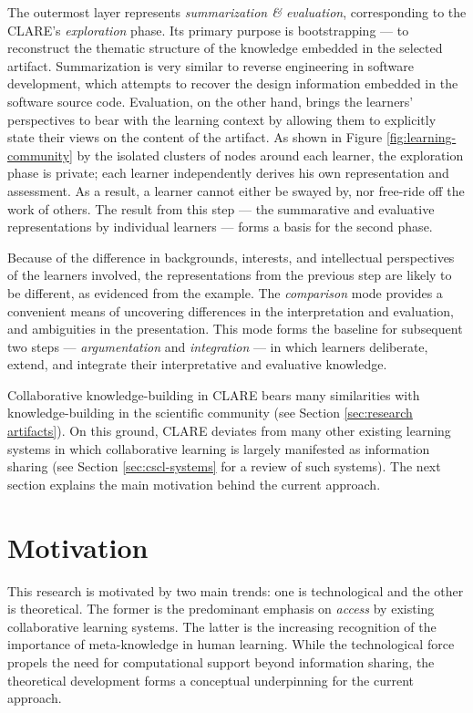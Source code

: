 The outermost layer represents {\it summarization \& evaluation\/},
corresponding to the CLARE's {\it exploration\/} phase. Its primary purpose
is bootstrapping --- to reconstruct the thematic structure of the knowledge
embedded in the selected artifact. Summarization is very similar to reverse
engineering in software development, which attempts to recover the design
information embedded in the software source code.  Evaluation, on the other
hand, brings the learners' perspectives to bear with the learning context
by allowing them to explicitly state their views on the content of the
artifact. As shown in Figure \ref{fig:learning-community} by the isolated
clusters of nodes around each learner, the exploration phase is private;
each learner independently derives his own representation and
assessment. As a result, a learner cannot either be swayed by, nor
free-ride off the work of others. The result from this step --- the
summarative and evaluative representations by individual learners --- forms a
basis for the second phase.

Because of the difference in backgrounds, interests, and intellectual
perspectives of the learners involved, the representations from the
previous step are likely to be different, as evidenced from the example.
The {\it comparison\/} mode provides a convenient means of uncovering
differences in the interpretation and evaluation, and ambiguities in the
presentation.  This mode forms the baseline for subsequent two steps --- {\it
argumentation } and {\it integration\/} --- in which learners deliberate,
extend, and integrate their interpretative and evaluative knowledge.

Collaborative knowledge-building in CLARE bears many similarities with
knowledge-building in the scientific community (see Section
\ref{sec:research artifacts}). On this ground, CLARE deviates from many
other existing learning systems in which collaborative learning is largely
manifested as information sharing (see Section \ref{sec:cscl-systems} for a
review of such systems). The next section explains the main motivation
behind the current approach.


\section{Motivation}
\label{sec:motivation}

This research is motivated by two main trends: one is technological and the
other is theoretical. The former is the predominant emphasis on {\it
access} by existing collaborative learning systems. The latter is the
increasing recognition of the importance of meta-knowledge in human
learning. While the technological force propels the need for computational
support beyond information sharing, the theoretical development forms a
conceptual underpinning for the current approach.


